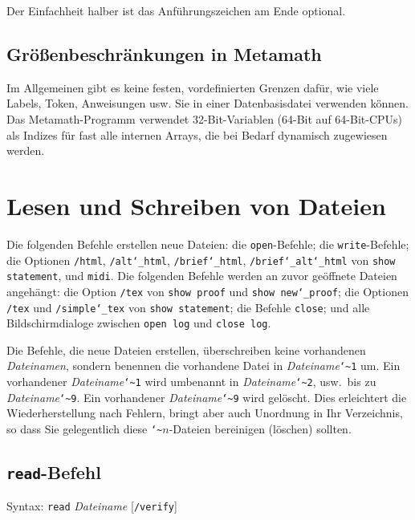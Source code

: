 Der Einfachheit halber ist das Anführungszeichen am Ende optional.


\subsection{Größenbeschränkungen in Metamath}

Im Allgemeinen gibt es keine festen, vordefinierten Grenzen dafür, wie viele Labels, Token, Anweisungen usw. Sie in einer Datenbasisdatei verwenden können.  Das Metamath-Programm verwendet 32-Bit-Variablen (64-Bit auf 64-Bit-CPUs) als Indizes für fast alle internen Arrays, die bei Bedarf dynamisch zugewiesen werden.


\section{Lesen und Schreiben von Dateien}

Die folgenden Befehle erstellen neue Dateien: die \texttt{open}-Befehle; die \texttt{write}-Befehle; die Optionen \texttt{/html}, \texttt{/alt{\char`\_}html}, \texttt{/brief{\char`\_}html}, \texttt{/brief{\char`\_}alt{\char`\_}html} von \texttt{show statement}, und \texttt{midi}.  Die folgenden Befehle werden an zuvor geöffnete Dateien angehängt: die Option \texttt{/tex} von \texttt{show proof} und \texttt{show new{\char`\_}proof}; die Optionen \texttt{/tex} und \texttt{/simple{\char`\_}tex} von \texttt{show statement}; die Befehle \texttt{close}; und alle Bildschirmdialoge zwischen \texttt{open log} und \texttt{close log}.

Die Befehle, die neue Dateien erstellen, überschreiben keine vorhandenen {\em Dateinamen}, sondern benennen die vorhandene Datei in {\em Dateiname}\texttt{{\char`\~}1} um.  Ein vorhandener {\em Dateiname}\texttt{{\char`\~}1} wird umbenannt in {\em Dateiname}\texttt{{\char`\~}2}, usw.\ bis zu {\em Dateiname}\texttt{{\char`\~}9}.  Ein vorhandener {\em Dateiname}\texttt{{\char`\~}9} wird gelöscht.  Dies erleichtert die Wiederherstellung nach Fehlern, bringt aber auch Unordnung in Ihr Verzeichnis, so dass Sie gelegentlich diese \texttt{{\char`\~}}$n$-Dateien bereinigen (löschen) sollten.


\subsection{\texttt{read}-Befehl}

Syntax:  \texttt{read} {\em Dateiname} [\texttt{/verify}]

